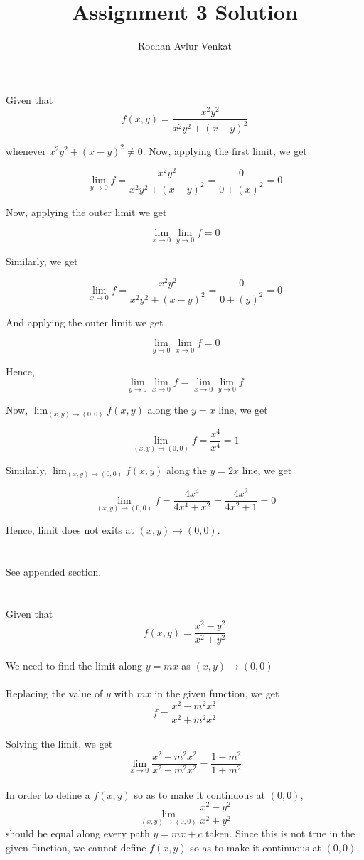\documentclass[11pt]{article}
\begin{document}
\title{Assignment 3 Solution}
\author{Rochan Avlur Venkat}
\maketitle

\section{}
Given that $$f(x,y) = \frac{x^{2}y^{2}}{x^{2}y^{2} + (x-y)^{2}}$$

whenever $x^{2}y^{2} + (x - y)^{2} \neq 0$. Now, applying the first limit, we get

$$\lim_{y\to0}f = \frac{x^{2}y^{2}}{x^{2}y^{2} + (x-y)^{2}} = \frac{0}{0 + (x)^{2}} = 0$$

Now, applying the outer limit we get

$$\lim_{x\to0}\lim_{y\to0}f = 0$$

Similarly, we get

$$\lim_{x\to0}f = \frac{x^{2}y^{2}}{x^{2}y^{2} + (x-y)^{2}} = \frac{0}{0 + (y)^{2}} = 0$$

And applying the outer limit we get

$$\lim_{y\to0}\lim_{x\to0}f = 0$$

Hence, $$\lim_{y\to0}\lim_{x\to0}f = \lim_{x\to0}\lim_{y\to0}f$$

Now, $\lim_{(x,y)\to(0,0)}f(x,y)$ along the $y=x$ line, we get

$$\lim_{(x,y)\to(0,0)}f = \frac{x^{4}}{x^{4}} = 1$$

Similarly, $\lim_{(x,y)\to(0,0)}f(x,y)$ along the $y=2x$ line, we get

$$\lim_{(x,y)\to(0,0)}f = \frac{4x^{4}}{4x^{4} + x^{2}} = \frac{4x^{2}}{4x^{2} + 1} = 0$$

Hence, limit does not exits at $(x,y) \to (0,0)$.

\section{}

See appended section.

\section{}
Given that $$f(x,y) = \frac{x^{2} - y^{2}}{x^{2} + y^{2}}$$
\\
We need to find the limit along $y = mx$ as $(x,y) \rightarrow (0,0)$
\\
\\
Replacing the value of $y$ with $mx$ in the given function, we get $$f = \frac{x^{2} - m^{2}x^{2}}{x^{2} + m^{2}x^{2}}$$
\\
Solving the limit, we get $$\lim_{x\to0} \frac{x^{2} - m^{2}x^{2}}{x^{2} + m^{2}x^{2}} = \frac{1 - m^{2}}{1 + m^{2}}$$
\\
In order to define a $f(x,y)$ so as to make it continuous at $(0,0)$, $$\lim_{(x,y)\to(0,0)} \frac{x^{2} - y^{2}}{x^{2} + y^{2}}$$ should be equal along every path $y = mx + c$ taken. Since this is not true in the given function, we cannot define $f(x,y)$ so as to make it continuous at $(0,0)$.
\end{document}
